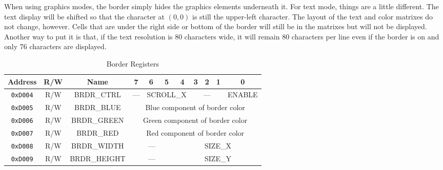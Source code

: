 When using graphics modes, the border simply hides the graphics elements underneath it. For text mode, things are a little different. The text display will be shifted so that the character at $(0, 0)$ is still the upper-left character. The layout of the text and color matrixes do not change, however. Cells that are under the right side or bottom of the border will still be in the matrixes but will not be displayed. Another way to put it is that, if the text resolution is 80 characters wide, it will remain 80 characters per line even if the border is on and only 76 characters are displayed.

\begin{table}[h]
    \begin{center}
        \begin{tabular}{|c|c|c|c|c|c|c|c|c|c|c|} \hline
            Address & R/W & Name & 7 & 6 & 5 & 4 & 3 & 2 & 1 & 0 \\\hline\hline
            \verb+0xD004+ & R/W & BRDR\_CTRL & --- & \multicolumn{3}{|c|}{SCROLL\_X} & \multicolumn{3}{|c|}{---} & ENABLE \\ \hline
            \verb+0xD005+ & R/W & BRDR\_BLUE & \multicolumn{8}{|c|}{Blue component of border color} \\ \hline
            \verb+0xD006+ & R/W & BRDR\_GREEN & \multicolumn{8}{|c|}{Green component of border color} \\ \hline
            \verb+0xD007+ & R/W & BRDR\_RED & \multicolumn{8}{|c|}{Red component of border color} \\ \hline
            \verb+0xD008+ & R/W & BRDR\_WIDTH & \multicolumn{3}{|c|}{---} & \multicolumn{5}{|c|}{SIZE\_X} \\ \hline
            \verb+0xD009+ & R/W & BRDR\_HEIGHT & \multicolumn{3}{|c|}{---} & \multicolumn{5}{|c|}{SIZE\_Y} \\ \hline
        \end{tabular}
    \end{center}
    \caption{Border Registers}
    \label{tab:brdr_reg}
\end{table}


